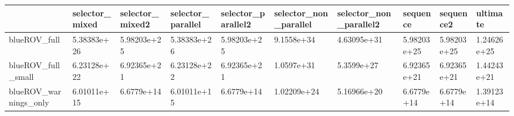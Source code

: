 \begin{tabular}{llllllllll}
\toprule
{} & selector\_mixed & selector\_mixed2 & selector\_parallel & selector\_parallel2 & selector\_non\_parallel & selector\_non\_parallel2 &     sequence &    sequence2 &     ultimate \\
\midrule
blueROV\_full          &    5.38383e+26 &     5.98203e+25 &       5.38383e+26 &        5.98203e+25 &            9.1558e+34 &            4.63095e+31 &  5.98203e+25 &  5.98203e+25 &  1.24626e+25 \\
blueROV\_full\_small    &    6.23128e+22 &     6.92365e+21 &       6.23128e+22 &        6.92365e+21 &            1.0597e+31 &             5.3599e+27 &  6.92365e+21 &  6.92365e+21 &  1.44243e+21 \\
blueROV\_warnings\_only &    6.01011e+15 &      6.6779e+14 &       6.01011e+15 &         6.6779e+14 &           1.02209e+24 &            5.16966e+20 &   6.6779e+14 &   6.6779e+14 &  1.39123e+14 \\
\bottomrule
\end{tabular}
